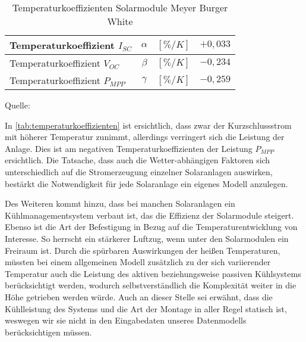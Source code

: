 \documentclass[12pt, a4paper]{article}
\begin{document}
\begin{table}[h]
\begin{center}
\def\arraystretch{1.5}
\setlength\tabcolsep{0.85cm}
\begin{tabular}{| l | c | r | c |}
\hline
Temperaturkoeffizient $I_{SC}$ &	$\alpha$ & 	$[\%/K]$ &		$+0,033$ \\ \hline
Temperaturkoeffizient $V_{OC}$ & 	$\beta$  &	$[\%/K]$ & 		$-0,234$ \\ \hline
Temperaturkoeffizient $P_{MPP}$ & 	$\gamma$  &	$[\%/K]$ & 		$-0,259$ \\ \hline
\end{tabular}
\end{center}

\captionsetup{justification=raggedleft,singlelinecheck=false,skip=-10pt}
\caption*{\scriptsize{Quelle: \cite{meyerburger}}}
\captionsetup{justification=centering,singlelinecheck=false,skip=25pt} 
\caption{Temperaturkoeffizienten Solarmodule Meyer Burger White}
\label{tab:temperaturkoeffizienten} 
\end{table}


In \autoref{tab:temperaturkoeffizienten} ist ersichtlich, dass zwar der Kurzschlussstrom mit höherer Temperatur zunimmt, allerdings verringert sich die Leistung der Anlage. Dies ist am negativen Temperaturkoeffizienten der Leistung $P_{MPP}$ ersichtlich. Die Tatsache, dass auch die Wetter-abhängigen Faktoren sich unterschiedlich auf die Stromerzeugung einzelner Solaranlagen auswirken, bestärkt die Notwendigkeit für jede Solaranlage ein eigenes Modell anzulegen.

Des Weiteren kommt hinzu, dass bei manchen Solaranlagen ein Kühlmanagementsystem verbaut ist, das die Effizienz der Solarmodule steigert. Ebenso ist die Art der Befestigung in Bezug auf die Temperaturentwicklung von Interesse. So herrscht ein stärkerer Luftzug, wenn unter den Solarmodulen ein Freiraum ist. Durch die spürbaren Auswirkungen der heißen Temperaturen, müssten bei einem allgemeinen Modell zusätzlich zu der sich variierender Temperatur auch die Leistung des aktiven beziehungsweise passiven Kühlsystems berücksichtigt werden, wodurch selbstverständlich die Komplexität weiter in die Höhe getrieben werden würde. Auch an dieser Stelle sei erwähnt, dass die Kühlleistung des Systems und die Art der Montage in aller Regel statisch ist, weswegen wir sie nicht in den Eingabedaten unseres Datenmodells berücksichtigen müssen.
\end{document}

